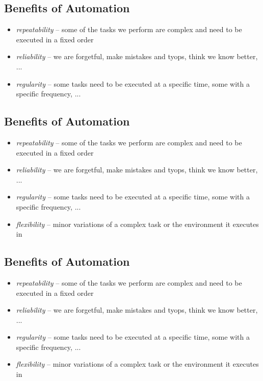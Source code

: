 \documentclass[xga]{xdvislides}
\begin{document}
\subsection{Benefits of Automation}
\begin{itemize}
	\item {\em repeatability} -- some of the tasks we
		perform are complex and need to be
		executed in a fixed order
	\item {\em reliability} -- we are forgetful, make
		mistakes and tyops, think we know
		better, ...
	\item {\em regularity} -- some tasks need to
		be executed at a specific time, some with
		a specific frequency, ...
\end{itemize}

\subsection{Benefits of Automation}
\begin{itemize}
	\item {\em repeatability} -- some of the tasks we
		perform are complex and need to be
		executed in a fixed order
	\item {\em reliability} -- we are forgetful, make
		mistakes and tyops, think we know
		better, ...
	\item {\em regularity} -- some tasks need to
		be executed at a specific time, some with
		a specific frequency, ...
	\item {\em flexibility} -- minor variations of
		a complex task or the environment it
		executes in
\end{itemize}


\subsection{Benefits of Automation}
\begin{itemize}
	\item {\em repeatability} -- some of the tasks we
		perform are complex and need to be
		executed in a fixed order
	\item {\em reliability} -- we are forgetful, make
		mistakes and tyops, think we know
		better, ...
	\item {\em regularity} -- some tasks need to
		be executed at a specific time, some with
		a specific frequency, ...
	\item {\em flexibility} -- minor variations of
		a complex task or the environment it
		executes in
\end{itemize}
\end{document}
